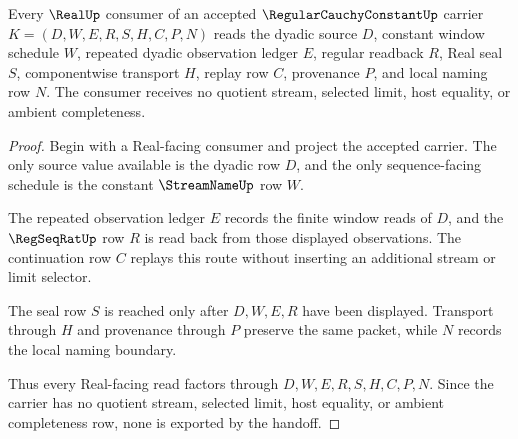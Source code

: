 \begin{theorem}
\label{thm:regular-cauchy-constant-real-seal-handoff}
Every $\RealUp$ consumer of an accepted $\RegularCauchyConstantUp$ carrier $K=(D,W,E,R,S,H,C,P,N)$ reads the dyadic source $D$, constant window schedule $W$, repeated dyadic observation ledger $E$, regular readback $R$, Real seal $S$, componentwise transport $H$, replay row $C$, provenance $P$, and local naming row $N$. The consumer receives no quotient stream, selected limit, host equality, or ambient completeness.
\end{theorem}
\begin{proof}
Begin with a Real-facing consumer and project the accepted carrier. The only source value available is the dyadic row $D$, and the only sequence-facing schedule is the constant $\StreamNameUp$ row $W$.

The repeated observation ledger $E$ records the finite window reads of $D$, and the $\RegSeqRatUp$ row $R$ is read back from those displayed observations. The continuation row $C$ replays this route without inserting an additional stream or limit selector.

The seal row $S$ is reached only after $D,W,E,R$ have been displayed. Transport through $H$ and provenance through $P$ preserve the same packet, while $N$ records the local naming boundary.

Thus every Real-facing read factors through $D,W,E,R,S,H,C,P,N$. Since the carrier has no quotient stream, selected limit, host equality, or ambient completeness row, none is exported by the handoff.
\end{proof}


\begin{closurestatus}{\RegularCauchyConstantUp}
  \theoryclosure{\seedClosure}
  \formalstatus{\unformalizedV}
\end{closurestatus}
